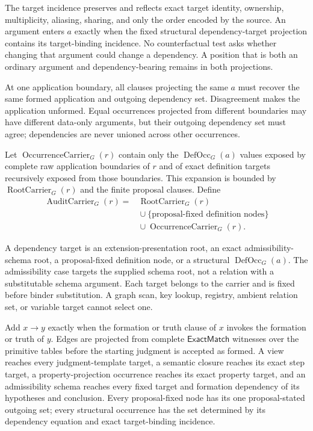 \documentclass[11pt,twoside]{article}
\newcommand{\ExactMatch}{\mathsf{ExactMatch}}
\begin{document}
The target incidence preserves and reflects exact target identity, ownership,
multiplicity, aliasing, sharing, and only the order encoded by the source.  An
argument enters \(a\) exactly when the fixed structural
dependency-target projection contains its target-binding incidence.  No
counterfactual test asks whether changing that argument could change a dependency.
A position that is both an ordinary argument and dependency-bearing remains in
both projections.

At one application boundary, all clauses projecting the same \(a\) must recover
the same formed application and outgoing dependency set.  Disagreement makes the
application unformed.  Equal occurrences projected from different boundaries may
have different data-only arguments, but their outgoing dependency set must agree;
dependencies are never unioned across other occurrences.

Let \(\operatorname{OccurrenceCarrier}_G(r)\) contain only the
\(\operatorname{DefOcc}_G(a)\) values exposed by complete raw application
boundaries of \(r\) and of exact definition targets recursively exposed from those
boundaries.  This expansion is bounded by
\(\operatorname{RootCarrier}_G(r)\) and the finite proposal clauses.  Define
\[
\begin{split}
 \operatorname{AuditCarrier}_G(r)
   ={}&\operatorname{RootCarrier}_G(r)\\
      &{}\cup\{\text{proposal-fixed definition nodes}\}\\
      &{}\cup\operatorname{OccurrenceCarrier}_G(r).
\end{split}
\]

A dependency target is an extension-presentation root, an exact
admissibility-schema root, a proposal-fixed definition node, or a structural
\(\operatorname{DefOcc}_G(a)\).  The admissibility case targets the supplied
schema root, not a relation with a substitutable schema argument.  Each target
belongs to the carrier and is fixed before binder substitution.  A graph scan,
key lookup, registry, ambient relation set, or variable target cannot select one.

Add \(x\to y\) exactly when the formation or truth clause of \(x\) invokes the
formation or truth of \(y\).  Edges are projected from complete
\(\ExactMatch\) witnesses over the primitive tables
before the starting judgment is accepted as formed.  A view reaches every
judgment-template target, a semantic closure reaches its exact step target, a
property-projection occurrence reaches its exact property target, and an
admissibility schema reaches every fixed target and formation dependency of its
hypotheses and conclusion.
Every proposal-fixed node has its one proposal-stated outgoing set; every
structural occurrence has the set determined by its dependency equation and exact
target-binding incidence.
\end{document}
